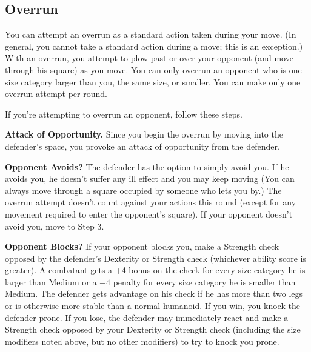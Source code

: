 \subsection{Overrun}
You can attempt an overrun as a standard action taken during your move. (In general, you cannot take a standard action during a move; this is an exception.) With an overrun, you attempt to plow past or over your opponent (and move through his square) as you move. You can only overrun an opponent who is one size category larger than you, the same size, or smaller. You can make only one overrun attempt per round.

If you're attempting to overrun an opponent, follow these steps.

\begin{enumerate*}
\item \textbf{Attack of Opportunity.} Since you begin the overrun by moving into the defender's space, you provoke an attack of opportunity from the defender.

\item \textbf{Opponent Avoids?} The defender has the option to simply avoid you. If he avoids you, he doesn't suffer any ill effect and you may keep moving (You can always move through a square occupied by someone who lets you by.) The overrun attempt doesn't count against your actions this round (except for any movement required to enter the opponent's square). If your opponent doesn't avoid you, move to Step 3.

\item \textbf{Opponent Blocks?} If your opponent blocks you, make a Strength check opposed by the defender's Dexterity or Strength check (whichever ability score is greater). A combatant gets a +4 bonus on the check for every size category he is larger than Medium or a $-4$ penalty for every size category he is smaller than Medium. The defender gets advantage on his check if he has more than two legs or is otherwise more stable than a normal humanoid. If you win, you knock the defender prone. If you lose, the defender may immediately react and make a Strength check opposed by your Dexterity or Strength check (including the size modifiers noted above, but no other modifiers) to try to knock you prone.


\end{enumerate*}
